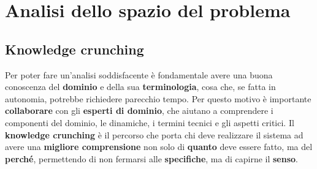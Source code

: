 \chapter{Analisi dello spazio del problema}

	\section{Knowledge crunching}
    Per poter fare un'analisi soddisfacente è fondamentale avere una buona conoscenza del \textbf{dominio} e della sua \textbf{terminologia}, cosa che, se fatta in autonomia, potrebbe richiedere parecchio tempo. Per questo motivo è importante \textbf{collaborare} con gli \textbf{esperti di dominio}, che aiutano a comprendere i componenti del dominio, le dinamiche, i termini tecnici e gli aspetti critici.
    Il \textbf{knowledge crunching} è il percorso che porta chi deve realizzare il sistema ad avere una \textbf{migliore comprensione} non solo di \textbf{quanto} deve essere fatto, ma del \textbf{perché}, permettendo di non fermarsi alle \textbf{specifiche}, ma di capirne il \textbf{senso}. 
    
